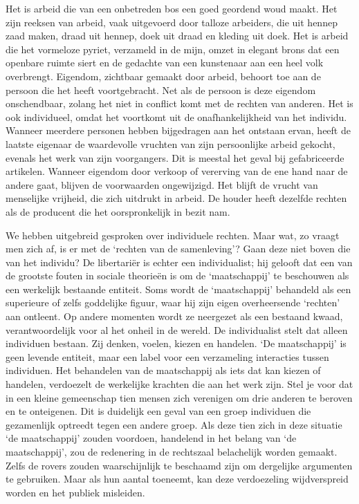\documentclass[
  a5paper,
  smalldemyvopaper,10pt,twoside,onecolumn,openright,extrafontsizes,hidelinks]{memoir}
\begin{document}
Het is arbeid die van een onbetreden bos een goed geordend woud maakt.
Het zijn reeksen van arbeid, vaak uitgevoerd door talloze arbeiders, die
uit hennep zaad maken, draad uit hennep, doek uit draad en kleding uit
doek. Het is arbeid die het vormeloze pyriet, verzameld in de mijn,
omzet in elegant brons dat een openbare ruimte siert en de gedachte van
een kunstenaar aan een heel volk overbrengt. Eigendom, zichtbaar gemaakt
door arbeid, behoort toe aan de persoon die het heeft voortgebracht. Net
als de persoon is deze eigendom onschendbaar, zolang het niet in
conflict komt met de rechten van anderen. Het is ook individueel, omdat
het voortkomt uit de onafhankelijkheid van het individu. Wanneer
meerdere personen hebben bijgedragen aan het ontstaan ervan, heeft de
laatste eigenaar de waardevolle vruchten van zijn persoonlijke arbeid
gekocht, evenals het werk van zijn voorgangers. Dit is meestal het geval
bij gefabriceerde artikelen. Wanneer eigendom door verkoop of vererving
van de ene hand naar de andere gaat, blijven de voorwaarden ongewijzigd.
Het blijft de vrucht van menselijke vrijheid, die zich uitdrukt in
arbeid. De houder heeft dezelfde rechten als de producent die het
oorspronkelijk in bezit nam.

We hebben uitgebreid gesproken over individuele rechten. Maar wat, zo
vraagt men zich af, is er met de `rechten van de samenleving'? Gaan deze
niet boven die van het individu? De libertariër is echter een
individualist; hij gelooft dat een van de grootste fouten in sociale
theorieën is om de `maatschappij' te beschouwen als een werkelijk
bestaande entiteit. Soms wordt de `maatschappij' behandeld als een
superieure of zelfs goddelijke figuur, waar hij zijn eigen overheersende
`rechten' aan ontleent. Op andere momenten wordt ze neergezet als een
bestaand kwaad, verantwoordelijk voor al het onheil in de wereld. De
individualist stelt dat alleen individuen bestaan. Zij denken, voelen,
kiezen en handelen. `De maatschappij' is geen levende entiteit, maar een
label voor een verzameling interacties tussen individuen. Het behandelen
van de maatschappij als iets dat kan kiezen of handelen, verdoezelt de
werkelijke krachten die aan het werk zijn. Stel je voor dat in een
kleine gemeenschap tien mensen zich verenigen om drie anderen te beroven
en te onteigenen. Dit is duidelijk een geval van een groep individuen
die gezamenlijk optreedt tegen een andere groep. Als deze tien zich in
deze situatie `de maatschappij' zouden voordoen, handelend in het belang
van `de maatschappij', zou de redenering in de rechtszaal belachelijk
worden gemaakt. Zelfs de rovers zouden waarschijnlijk te beschaamd zijn
om dergelijke argumenten te gebruiken. Maar als hun aantal toeneemt, kan
deze verdoezeling wijdverspreid worden en het publiek misleiden.
\end{document}
